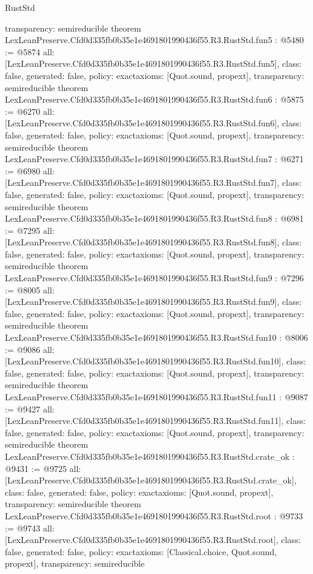 \begin{lexlean}{RustStd}
\begin{coremodule}
{  transparency: semireducible
}
theorem LexLeanPreserve.Cfd0d335fb0b35e1e4691801990436f55.R3.RustStd.fun5 : @5480 := @5874 {
  all: [LexLeanPreserve.Cfd0d335fb0b35e1e4691801990436f55.R3.RustStd.fun5],
  class: false,
  generated: false,
  policy: exact{axioms: [Quot.sound, propext]},
  transparency: semireducible
}
theorem LexLeanPreserve.Cfd0d335fb0b35e1e4691801990436f55.R3.RustStd.fun6 : @5875 := @6270 {
  all: [LexLeanPreserve.Cfd0d335fb0b35e1e4691801990436f55.R3.RustStd.fun6],
  class: false,
  generated: false,
  policy: exact{axioms: [Quot.sound, propext]},
  transparency: semireducible
}
theorem LexLeanPreserve.Cfd0d335fb0b35e1e4691801990436f55.R3.RustStd.fun7 : @6271 := @6980 {
  all: [LexLeanPreserve.Cfd0d335fb0b35e1e4691801990436f55.R3.RustStd.fun7],
  class: false,
  generated: false,
  policy: exact{axioms: [Quot.sound, propext]},
  transparency: semireducible
}
theorem LexLeanPreserve.Cfd0d335fb0b35e1e4691801990436f55.R3.RustStd.fun8 : @6981 := @7295 {
  all: [LexLeanPreserve.Cfd0d335fb0b35e1e4691801990436f55.R3.RustStd.fun8],
  class: false,
  generated: false,
  policy: exact{axioms: [Quot.sound, propext]},
  transparency: semireducible
}
theorem LexLeanPreserve.Cfd0d335fb0b35e1e4691801990436f55.R3.RustStd.fun9 : @7296 := @8005 {
  all: [LexLeanPreserve.Cfd0d335fb0b35e1e4691801990436f55.R3.RustStd.fun9],
  class: false,
  generated: false,
  policy: exact{axioms: [Quot.sound, propext]},
  transparency: semireducible
}
theorem LexLeanPreserve.Cfd0d335fb0b35e1e4691801990436f55.R3.RustStd.fun10 : @8006 := @9086 {
  all: [LexLeanPreserve.Cfd0d335fb0b35e1e4691801990436f55.R3.RustStd.fun10],
  class: false,
  generated: false,
  policy: exact{axioms: [Quot.sound, propext]},
  transparency: semireducible
}
theorem LexLeanPreserve.Cfd0d335fb0b35e1e4691801990436f55.R3.RustStd.fun11 : @9087 := @9427 {
  all: [LexLeanPreserve.Cfd0d335fb0b35e1e4691801990436f55.R3.RustStd.fun11],
  class: false,
  generated: false,
  policy: exact{axioms: [Quot.sound, propext]},
  transparency: semireducible
}
theorem LexLeanPreserve.Cfd0d335fb0b35e1e4691801990436f55.R3.RustStd.crate_ok : @9431 := @9725 {
  all: [LexLeanPreserve.Cfd0d335fb0b35e1e4691801990436f55.R3.RustStd.crate_ok],
  class: false,
  generated: false,
  policy: exact{axioms: [Quot.sound, propext]},
  transparency: semireducible
}
theorem LexLeanPreserve.Cfd0d335fb0b35e1e4691801990436f55.R3.RustStd.root : @9733 := @9743 {
  all: [LexLeanPreserve.Cfd0d335fb0b35e1e4691801990436f55.R3.RustStd.root],
  class: false,
  generated: false,
  policy: exact{axioms: [Classical.choice, Quot.sound, propext]},
  transparency: semireducible
}


\end{coremodule}
\end{lexlean}
